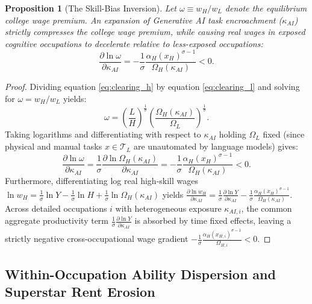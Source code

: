 \documentclass[12pt]{article}
\newtheorem{proposition}{Proposition}
\begin{document}
\begin{proposition}[The Skill-Bias Inversion]
\label{prop:inversion}
Let $\omega \equiv w_H / w_L$ denote the equilibrium college wage premium. An expansion of Generative AI task encroachment ($\kappa_{AI}$) strictly compresses the college wage premium, while causing real wages in exposed cognitive occupations to decelerate relative to less-exposed occupations:
\begin{equation}
\frac{\partial \ln \omega}{\partial \kappa_{AI}} = -\frac{1}{\sigma} \frac{\alpha_H(x_H)^{\sigma - 1}}{\Omega_H(\kappa_{AI})} < 0.
\end{equation}
\end{proposition}
\begin{proof}
Dividing equation \eqref{eq:clearing_h} by equation \eqref{eq:clearing_l} and solving for $\omega = w_H / w_L$ yields:
\begin{equation}
\omega = \left( \frac{L}{H} \right)^{\frac{1}{\sigma}} \left( \frac{\Omega_H(\kappa_{AI})}{\Omega_L} \right)^{\frac{1}{\sigma}}.
\end{equation}
Taking logarithms and differentiating with respect to $\kappa_{AI}$ holding $\Omega_L$ fixed (since physical and manual tasks $x \in \mathcal{T}_L$ are unautomated by language models) gives:
\begin{equation}
\frac{\partial \ln \omega}{\partial \kappa_{AI}} = \frac{1}{\sigma} \frac{\partial \ln \Omega_H(\kappa_{AI})}{\partial \kappa_{AI}} = -\frac{1}{\sigma} \frac{\alpha_H(x_H)^{\sigma - 1}}{\Omega_H(\kappa_{AI})} < 0.
\end{equation}
Furthermore, differentiating log real high-skill wages $\ln w_H = \frac{1}{\sigma} \ln Y - \frac{1}{\sigma} \ln H + \frac{1}{\sigma} \ln \Omega_H(\kappa_{AI})$ yields $\frac{\partial \ln w_H}{\partial \kappa_{AI}} = \frac{1}{\sigma} \frac{\partial \ln Y}{\partial \kappa_{AI}} - \frac{1}{\sigma} \frac{\alpha_H(x_H)^{\sigma - 1}}{\Omega_H(\kappa_{AI})}$. Across detailed occupations $i$ with heterogeneous exposure $\kappa_{AI, i}$, the common aggregate productivity term $\frac{1}{\sigma}\frac{\partial \ln Y}{\partial \kappa_{AI}}$ is absorbed by time fixed effects, leaving a strictly negative cross-occupational wage gradient $-\frac{1}{\sigma} \frac{\alpha_H(x_{H,i})^{\sigma - 1}}{\Omega_{H,i}} < 0$.
\end{proof}

\subsection{Within-Occupation Ability Dispersion and Superstar Rent Erosion}
\end{document}
